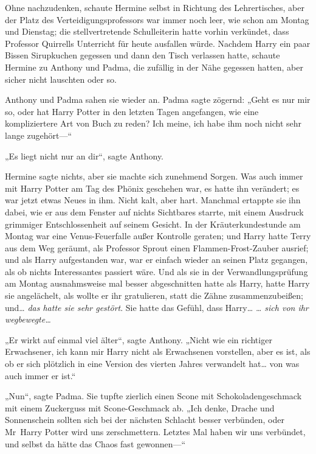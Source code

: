 {Ohne nachzudenken, schaute Hermine selbst in Richtung des Lehrertisches, aber der Platz des Verteidigungsprofessors war immer noch leer, wie schon am Montag und Dienstag; die stellvertretende Schulleiterin hatte vorhin verkündet, dass Professor Quirrells Unterricht für heute ausfallen würde. Nachdem Harry ein paar Bissen Sirupkuchen gegessen und dann den Tisch verlassen hatte, schaute Hermine zu Anthony und Padma, die zufällig in der Nähe gegessen hatten, aber sicher nicht lauschten oder so.

Anthony und Padma sahen sie wieder an. Padma sagte zögernd: „Geht es nur mir so, oder hat Harry Potter in den letzten Tagen angefangen, wie eine kompliziertere Art von Buch zu reden? Ich meine, ich habe ihm noch nicht sehr lange zugehört—“

„Es liegt nicht nur an dir“, sagte Anthony.

Hermine sagte nichts, aber sie machte sich zunehmend Sorgen. Was auch immer mit Harry Potter am Tag des Phönix geschehen war, es hatte ihn verändert; es war jetzt etwas Neues in ihm. Nicht kalt, aber hart. Manchmal ertappte sie ihn dabei, wie er aus dem Fenster auf nichts Sichtbares starrte, mit einem Ausdruck grimmiger Entschlossenheit auf seinem Gesicht. In der Kräuterkundestunde am Montag war eine Venus-Feuerfalle außer Kontrolle geraten; und Harry hatte Terry aus dem Weg geräumt, als Professor Sprout einen Flammen-Frost-Zauber ausrief; und als Harry aufgestanden war, war er einfach wieder an seinen Platz gegangen, als ob nichts Interessantes passiert wäre. Und als sie in der Verwandlungsprüfung am Montag ausnahmsweise mal besser abgeschnitten hatte als Harry, hatte Harry sie angelächelt, als wollte er ihr gratulieren, statt die Zähne zusammenzubeißen; und… \emph{das hatte sie sehr gestört}. Sie hatte das Gefühl, dass Harry… \emph{… sich von ihr wegbewegte…}

„Er wirkt auf einmal viel älter“, sagte Anthony. „Nicht wie ein richtiger Erwachsener, ich kann mir Harry nicht als Erwachsenen vorstellen, aber es ist, als ob er sich plötzlich in eine Version des vierten Jahres verwandelt hat… von was auch immer er ist.“

„Nun“, sagte Padma. Sie tupfte zierlich einen Scone mit Schokoladengeschmack mit einem Zuckerguss mit Scone-Geschmack ab. „Ich denke, Drache und Sonnenschein sollten sich bei der nächsten Schlacht besser verbünden, oder Mr~Harry Potter wird uns zerschmettern. Letztes Mal haben wir uns verbündet, und selbst da hätte das Chaos fast gewonnen—“

}
